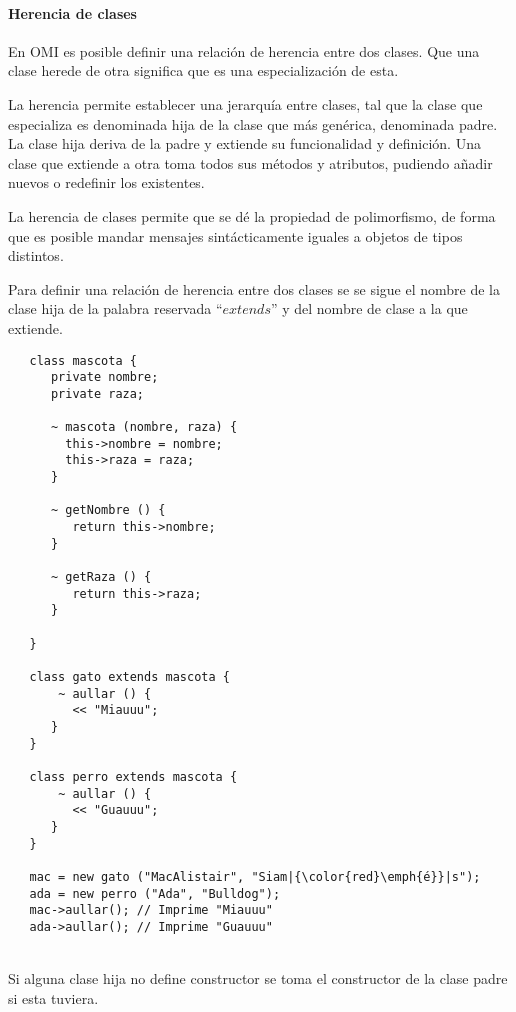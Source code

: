 \paragraph{Herencia de clases}


En OMI es posible definir una relación de herencia entre dos clases. Que una clase herede de otra significa 
que es una especialización de esta.  

La herencia permite establecer una jerarquía entre clases, tal que la clase que especializa es denominada 
hija de la clase que más genérica, denominada padre. La clase hija deriva de la padre y extiende su funcionalidad y definición.
Una clase que extiende a otra toma todos sus métodos y atributos, pudiendo añadir nuevos o redefinir los existentes.

La herencia de clases permite que se dé la propiedad de polimorfismo, de forma que 
es posible mandar mensajes sintácticamente iguales a objetos de tipos distintos.

Para definir una relación de herencia entre dos clases se se sigue el nombre de la clase hija de la palabra 
reservada ``$extends$'' y del nombre de clase a la que extiende. \\



\begin{lstlisting}
   class mascota {
      private nombre; 
      private raza;
      
      ~ mascota (nombre, raza) { 
        this->nombre = nombre; 
        this->raza = raza;
      }
      
      ~ getNombre () {
         return this->nombre;
      }
      
      ~ getRaza () {
         return this->raza;
      }
      
   }

   class gato extends mascota {
       ~ aullar () { 
         << "Miauuu";
      }
   }

   class perro extends mascota {
       ~ aullar () { 
         << "Guauuu";
      }
   }
   
   mac = new gato ("MacAlistair", "Siam|{\color{red}\emph{é}}|s"); 
   ada = new perro ("Ada", "Bulldog");  
   mac->aullar(); // Imprime "Miauuu"
   ada->aullar(); // Imprime "Guauuu"
\end{lstlisting}
\hfill\\ 

Si alguna clase hija no define constructor se toma el constructor de la clase padre si esta tuviera. 

